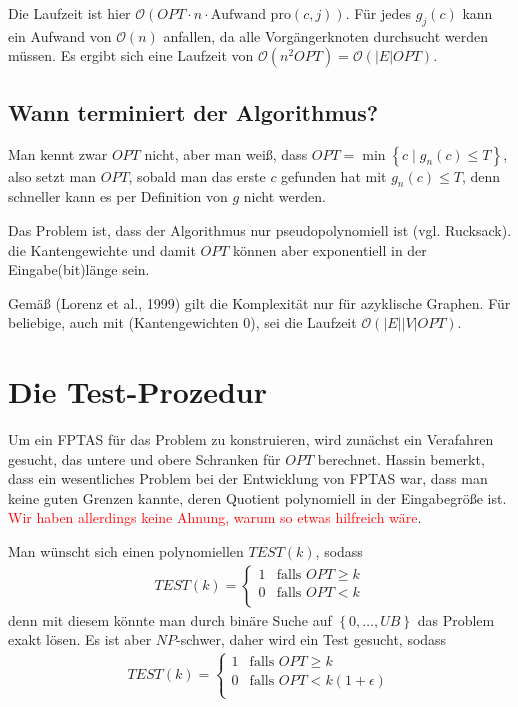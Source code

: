 \documentclass{article}
\begin{document}
Die Laufzeit ist hier $\mathcal{O}(OPT\cdot n \cdot \text{Aufwand pro
$(c,j)$})$. Für jedes $g_j(c)$ kann ein Aufwand von $\mathcal{O}(n)$ anfallen,
da alle Vorgängerknoten durchsucht werden müssen. Es ergibt sich eine Laufzeit
von $\mathcal{O}(n^2 OPT) = \mathcal{O}(|E| OPT)$.

\subsection{Wann terminiert der Algorithmus?}

Man kennt zwar $OPT$ nicht, aber man weiß, dass $OPT=\min\left\{c \mid g_n(c)
\le T\right\}$, also setzt man $OPT$, sobald man das erste $c$ gefunden hat mit 
$g_n(c)\le T$, denn schneller kann es per Definition von $g$ nicht werden.

Das Problem ist, dass der Algorithmus nur pseudopolynomiell ist (vgl. Rucksack).
die Kantengewichte und damit $OPT$ können aber exponentiell in der Eingabe(bit)länge sein.

Gemäß (Lorenz et al., 1999) gilt die Komplexität nur für azyklische Graphen. Für
beliebige, auch mit (Kantengewichten $0$), sei die Laufzeit
$\mathcal{O}(|E||V|OPT)$.

\section{Die Test-Prozedur}

Um ein FPTAS für das Problem zu konstruieren, wird zunächst ein Verafahren
gesucht, das untere und obere Schranken für $OPT$ berechnet. Hassin bemerkt,
dass ein wesentliches Problem bei der Entwicklung von FPTAS war, dass man keine
guten Grenzen kannte, deren Quotient polynomiell in der Eingabegröße ist.
\textcolor{red}{Wir haben allerdings keine Ahnung, warum so etwas hilfreich wäre}.

Man wünscht sich einen polynomiellen $TEST(k)$, sodass 
\begin{align*}
   TEST(k) = 
   \begin{cases}
      1 & \text{falls } OPT \ge k \\
      0 & \text{falls } OPT < k \\
   \end{cases} 
\end{align*}
denn mit diesem könnte man durch binäre Suche auf $\left\{0,\ldots,UB\right\}$ das
Problem exakt lösen. Es ist aber $NP$-schwer, daher wird ein Test gesucht,
sodass
\begin{align*}
   TEST(k) = 
   \begin{cases}
      1 & \text{falls } OPT \ge k \\
      0 & \text{falls } OPT < k(1 + \epsilon) \\
   \end{cases} 
\end{align*}
\end{document}
